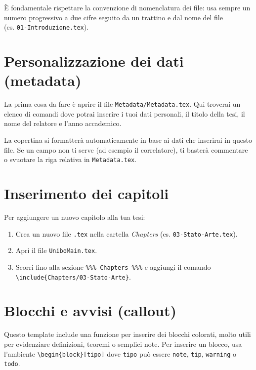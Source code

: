 {	È fondamentale rispettare la convenzione di nomenclatura dei file: usa sempre un numero progressivo a due cifre seguito da un trattino e dal nome del file \\ (es. \texttt{01-Introduzione.tex}).
	
	\newpage
	
	\section{Personalizzazione dei dati (metadata)}
	\label{sec:metadata-it}
	La prima cosa da fare è aprire il file \texttt{Metadata/Metadata.tex}. Qui troverai un elenco di comandi dove potrai inserire i tuoi dati personali, il titolo della tesi, il nome del relatore e l'anno accademico.
	
	\begin{block}[note]
		La copertina si formatterà automaticamente in base ai dati che inserirai in questo file. Se un campo non ti serve (ad esempio il correlatore), ti basterà commentare o svuotare la riga relativa in \texttt{Metadata.tex}.
	\end{block}
	
	\section{Inserimento dei capitoli}
	Per aggiungere un nuovo capitolo alla tua tesi:
	\begin{enumerate}
		\item Crea un nuovo file \texttt{.tex} nella cartella \textit{Chapters} (es. \texttt{03-Stato-Arte.tex}).
		\item Apri il file \texttt{UniboMain.tex}.
		\item Scorri fino alla sezione \texttt{\%\%\% Chapters \%\%\%} e aggiungi il comando \\ \texttt{\textbackslash include\{Chapters/03-Stato-Arte\}}.
	\end{enumerate}
	
	\section{Blocchi e avvisi (callout)}
	Questo template include una funzione per inserire dei blocchi colorati, molto utili per evidenziare definizioni, teoremi o semplici note. Per inserire un blocco, usa l'ambiente \texttt{\textbackslash begin\{block\}[tipo]} dove \texttt{tipo} può essere \texttt{note}, \texttt{tip}, \texttt{warning} o \texttt{todo}.
	
}
